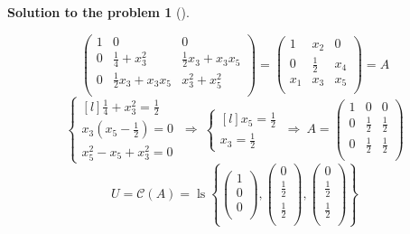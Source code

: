 \documentclass[12pt,a4]{article}
\newtheorem{solution}{Solution to the problem}
\newcommand\ls{\operatorname{ls}}
\renewcommand{\Im}{{\mathcal C}}
\begin{document}
{\begin{solution}[]
\begin{enumerate}[(a)]
\[\begin{pmatrix}
1 & 0 & 0 \\
0 & \frac14 + x_3^2 & \frac12 x_3 + x_3 x_5 \\
0 & \frac12 x_3 + x_3 x_5 & x_3^2 + x_5 ^ 2 \\
\end{pmatrix}
=
\begin{pmatrix}
1 & x_2 & 0 \\
0 & \frac{1}{2} & x_4 \\
x_1 & x_3 & x_5 \\
\end{pmatrix}
= A
\]
\[
\left \{ \begin{matrix}[l]
\frac14 + x_3^2 = \frac12 \\[2pt]
x_3 (x_5 - \frac12) = 0 \\[2pt]
x_5^2 - x_5 + x_3^2 = 0
\end{matrix} \right.
~ \Rightarrow ~
\left \{ \begin{matrix}[l]
x_5 = \frac12 \\[2pt]
x_3 = \frac12
\end{matrix} \right.
~ \Rightarrow ~
A = 
\begin{pmatrix}
1 & 0 & 0 \\[2pt]
0 & \frac12 & \frac12 \\[2pt]
0 & \frac12 & \frac12 \\[2pt]
\end{pmatrix}
\]
\[
U = \Im(A) = \ls \left \{
\begin{pmatrix}
1 \\ 0 \\ 0 \\
\end{pmatrix},
\begin{pmatrix}
0 \\ \frac12 \\ \frac12 \\
\end{pmatrix},
\begin{pmatrix}
0 \\ \frac12 \\ \frac12 \\
\end{pmatrix}
\right \}
\]
\end{enumerate}
\end{solution}
}
\end{document}
